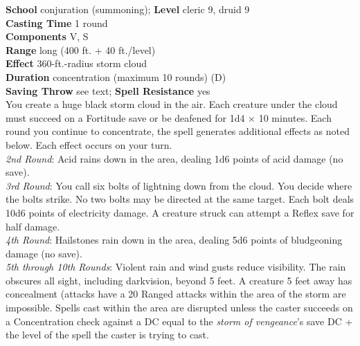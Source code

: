 \textbf{School} conjuration (summoning); \textbf{Level} cleric 9, druid 9\\
\textbf{Casting Time} 1 round\\
\textbf{Components} V, S\\
\textbf{Range} long (400 ft. + 40 ft./level)\\
\textbf{Effect} 360-ft.-radius storm cloud\\
\textbf{Duration} concentration (maximum 10 rounds) (D)\\
\textbf{Saving Throw} see text; \textbf{Spell Resistance} yes\\
You create a huge black storm cloud in the air. Each creature under the cloud must succeed on a Fortitude save or be deafened for 1d4 × 10 minutes. Each round you continue to concentrate, the spell generates additional effects as noted below. Each effect occurs on your turn.\\
\textit{2nd Round}: Acid rains down in the area, dealing 1d6 points of acid damage (no save).\\
\textit{3rd Round}: You call six bolts of lightning down from the cloud. You decide where the bolts strike. No two bolts may be directed at the same target. Each bolt deals 10d6 points of electricity damage. A creature struck can attempt a Reflex save for half damage.\\
\textit{4th Round}: Hailstones rain down in the area, dealing 5d6 points of bludgeoning damage (no save).\\
\textit{5th through 10th Rounds}: Violent rain and wind gusts reduce visibility. The rain obscures all sight, including darkvision, beyond 5 feet. A creature 5 feet away has concealment (attacks have a 20%
Ranged attacks within the area of the storm are impossible. Spells cast within the area are disrupted unless the caster succeeds on a Concentration check against a DC equal to the \textit{storm of vengeance}'s save DC + the level of the spell the caster is trying to cast.\\
